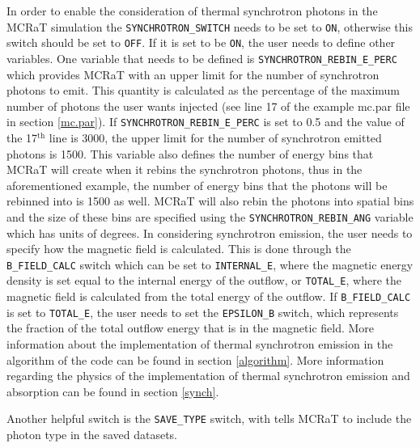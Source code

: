 \documentclass[12pt,a4paper]{article}
\begin{document}
In order to enable the consideration of thermal synchrotron photons in the MCRaT simulation the \texttt{SYNCHROTRON\_SWITCH} needs to be set to \texttt{ON}, otherwise this switch should be set to \texttt{OFF}. If it is set to be \texttt{ON}, the user needs to define other variables. One variable that needs to be defined is \texttt{SYNCHROTRON\_REBIN\_E\_PERC} which provides MCRaT with an upper limit for the number of synchrotron photons to emit. This quantity is calculated as the percentage of the maximum number of photons the user wants injected (see line 17 of the example mc.par file in section \ref{mc.par}). If \texttt{SYNCHROTRON\_REBIN\_E\_PERC} is set to 0.5 and the value of the 17$^\textrm{th}$ line is 3000, the upper limit for the number of synchrotron emitted photons is 1500. This variable also defines the number of energy bins that MCRaT will create when it rebins the synchrotron photons, thus in the aforementioned example, the number of energy bins that the photons will be rebinned into is 1500 as well. MCRaT will also rebin the photons into spatial bins and the size of these bins are specified using the \texttt{SYNCHROTRON\_REBIN\_ANG} variable which has units of degrees. In considering synchrotron emission, the user needs to specify how the magnetic field is calculated. This is done through the \texttt{B\_FIELD\_CALC} switch which can be set to \texttt{INTERNAL\_E}, where the magnetic energy density is set equal to the internal energy of the outflow, or \texttt{TOTAL\_E}, where the magnetic field is calculated from the total energy of the outflow. If \texttt{B\_FIELD\_CALC} is set to \texttt{TOTAL\_E}, the user needs to set the \texttt{EPSILON\_B} switch, which represents the fraction of the total outflow energy that is in the magnetic field. More information about the implementation of thermal synchrotron emission in the algorithm of the code can be found in section \ref{algorithm}. More information regarding the physics of the implementation of thermal synchrotron emission and absorption can be found in section \ref{synch}. 

Another helpful switch is the \texttt{SAVE\_TYPE} switch, with tells MCRaT to include the photon type in the saved datasets. 
\end{document}
